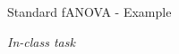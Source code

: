 \documentclass[11pt,compress,t,notes=noshow, aspectratio=169, xcolor=table]{beamer}
\begin{document}
\begin{frame}{Standard fANOVA - Example}

\textit{In-class task}



    


    
\end{frame}
\end{document}
